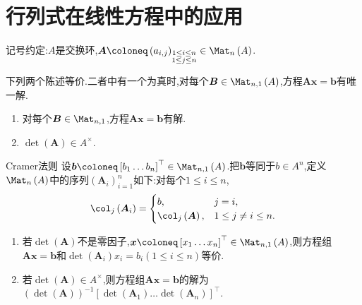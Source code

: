 \section{行列式在线性方程中的应用}

记号约定:$A$是交换环,$\boldsymbol{A}\coloneq\left(a_{i,j}\right)_{\substack{1\leq i\leq n\\1\leq j\leq n}}\in\Mat_{n}\left(A\right)$.

\begin{proposition}{}{}
	下列两个陈述等价.二者中有一个为真时,对每个$\boldsymbol{B}\in\Mat_{n,1}\left(A\right)$,方程$\boldsymbol{A}\boldsymbol{x}=\boldsymbol{b}$有唯一解.
	\begin{enumerate}
		\item 对每个$\boldsymbol{B}\in\Mat_{n,1}$,方程$\boldsymbol{A}\boldsymbol{x}=\boldsymbol{b}$有解.
		\item $\det\left(\boldsymbol{A}\right)\in A^{\times}$.
	\end{enumerate}
\end{proposition}

\begin{proposition}{Cramer法则}{}
	设$\boldsymbol{b}\coloneq\left[b_{1}\ldots b_{n}\right]^{\top}\in\Mat_{n,1}\left(A\right)$.把$\boldsymbol{b}$等同于$b\in A^{n}$,定义$\Mat_{n}\left(A\right)$中的序列$\left(\boldsymbol{A}_{i}\right)_{i=1}^{n}$如下:对每个$1\leq i\leq n$,
	\begin{align*}
		\col_{j}\left(\boldsymbol{A}_{i}\right)=
		\begin{cases}
			b,&j=i,\\
			\col_{j}\left(\boldsymbol{A}\right),&1\leq j\neq i\leq n.
		\end{cases}
	\end{align*}
	\begin{enumerate}
		\item 若$\det\left(\boldsymbol{A}\right)$不是零因子,$\boldsymbol{x}\coloneq\left[x_{1}\ldots x_{n}\right]^{\top}\in\Mat_{n,1}\left(A\right)$,则方程组$\boldsymbol{A}\boldsymbol{x}=\boldsymbol{b}$和$\det\left(\boldsymbol{A}_{i}\right)x_{i}=b_{i}(1\leq i\leq n)$等价.
		\item 若$\det\left(\boldsymbol{A}\right)\in A^{\times}$,则方程组$\boldsymbol{A}\boldsymbol{x}=\boldsymbol{b}$的解为$\left(\det\left(\boldsymbol{A}\right)\right)^{-1}\left[\det\left(\boldsymbol{A}_{1}\right)\ldots\det\left(\boldsymbol{A}_{n}\right)\right]^{\top}$.
	\end{enumerate}
\end{proposition}

